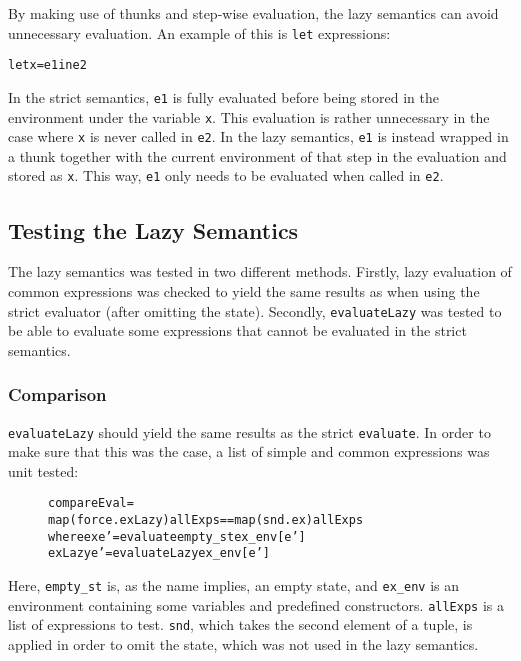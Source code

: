 By making use of thunks and step-wise evaluation, the lazy semantics can avoid unnecessary
evaluation. An example of this is \texttt{let} expressions:
\begin{alltt}
  let x = e1 in e2
\end{alltt}
In the strict semantics, \texttt{e1} is fully evaluated before being stored in the
environment under the variable \texttt{x}. 
This evaluation is rather unnecessary in the case where \texttt{x} is never called in
\texttt{e2}. In the lazy semantics, \texttt{e1} is instead wrapped in a thunk together with
the current environment of that step in the evaluation and stored as \texttt{x}. This way,
\texttt{e1} only needs to be evaluated when called in \texttt{e2}.

\subsection{Testing the Lazy Semantics}
\label{LazySemTest}

The lazy semantics was tested in two different methods.
Firstly, lazy evaluation of common
expressions was checked to yield the same results as when using the strict
evaluator (after omitting the state). Secondly, \texttt{evaluateLazy}
was tested to be able to evaluate some expressions that cannot be evaluated
in the strict semantics.


\subsubsection{Comparison}

\texttt{evaluateLazy} should yield the same results as the strict
\texttt{evaluate}. In order to make sure that this was the case, a list of
simple and common expressions was unit tested:

\begin{figure}[!ht]
\begin{alltt}
  compareEval =
    map (force . exLazy) allExps == map (snd . ex) allExps
      where ex     e' = evaluate empty_st ex_env [e']
            exLazy e' = evaluateLazy ex_env [e']
\end{alltt}
\end{figure}

\noindent Here, \texttt{empty\_st} is, as the name implies, an empty state, and
\texttt{ex\_env} is an environment containing some variables and predefined
constructors. \texttt{allExps} is a list of expressions to test.
\texttt{snd}, which takes the second element of a tuple, is applied in order to
omit the state, which was not used in the lazy semantics.


